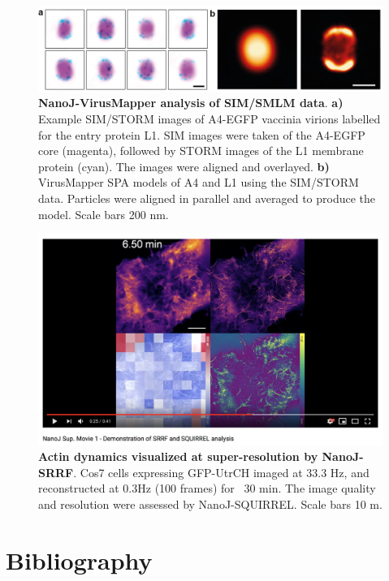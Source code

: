 \newpage

\begin{figure}
    \centering
    \includegraphics{Figures/dSTORM_Sup_L1.png}
    \caption{\textbf{NanoJ-VirusMapper analysis of SIM/SMLM data}. \textbf{a)} Example SIM/STORM images of A4-EGFP vaccinia virions labelled for the entry protein L1. SIM images were taken of the A4-EGFP core (magenta), followed by STORM images of the L1 membrane protein (cyan). The images were aligned and overlayed. \textbf{b)} VirusMapper SPA models of A4 and L1 using the SIM/STORM data. Particles were aligned in parallel and averaged to produce the model. Scale bars 200 nm.}
    \label{fig:supVM}
\end{figure}

\begin{figure}
    \centering
    \includegraphics[width=0.8\linewidth]{Figures/Figure_SMovieSRRF_v1.png}
    \caption{\textbf{Actin dynamics visualized at super-resolution by NanoJ-SRRF}. Cos7 cells expressing GFP-UtrCH imaged at 33.3 Hz, and reconstructed at 0.3Hz (100 frames) for ~30 min. The image quality and resolution were assessed by NanoJ-SQUIRREL. Scale bars 10 \textmu{}m.}
    \label{fig:supSRRFmovie}
\end{figure}

\newpage
\section*{Bibliography}



